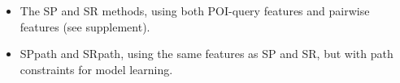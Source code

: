 \begin{itemize}[leftmargin=0.125in]
\item The SP and SR methods, %
      using both POI-query features and pairwise features (see supplement).

\item {\sc SPpath} and {\sc SRpath}, %
      using the same features as SP and SR, but with path constraints for model learning.
\end{itemize}%



